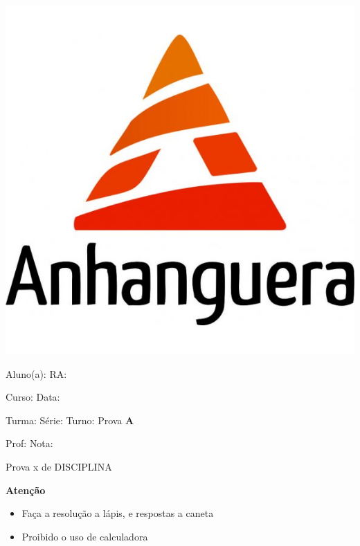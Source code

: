 \documentclass[a4paper]{article}
\begin{document}
\noindent\parbox[c]{.15\textwidth}{\includegraphics[width=.15\textwidth]{logo}}\hfill
\parbox[c]{.825\textwidth}{\raggedright%
{Aluno(a): \underline{\hspace{8.5cm}} RA: \underline{\hspace{2.3cm}}\par}
{Curso: \underline{\hspace{8.95cm}} Data: \underline{\hspace{2cm}}\par}
{Turma: \underline{\hspace{2cm}} Série: \underline{\hspace{2cm}}
  Turno: \underline{\hspace{2.5cm}} Prova {\bf\LARGE A}\par}
{Prof: \underline{\hspace{9.15cm}} Nota: \underline{\hspace{2cm}}\par}

\vspace{10pt}
}

{\large Prova x de DISCIPLINA}

\vspace{10pt}


\hrulefill

{\bf Atenção}

\begin{itemize}
\item Faça a resolução a lápis, e respostas a caneta
\item Proibido o uso de calculadora
\end{itemize}
\end{document}
